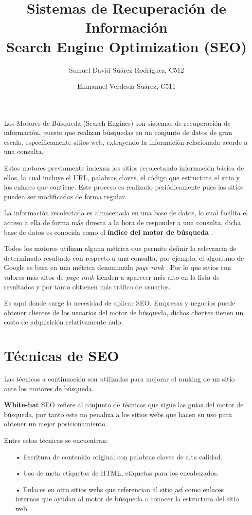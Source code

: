 \documentclass[12pt]{llncs}
\title{Sistemas de Recuperación de Información \\ Search Engine Optimization (SEO)}
\author{
    Samuel David Suárez Rodríguez, C512 \and
    Enmanuel Verdesia Suárez, C511
}
\date{}
\institute{Universidad de La Habana}
\begin{document}
\maketitle

Los Motores de Búsqueda (Search Engines) son sistemas de recuperación de información, puesto que realizan búsquedas en un conjunto de datos de gran escala, específicamente sitios web, extrayendo la información relacionada acorde a una consulta.

Estos motores previamente indexan los sitios recolectando información básica de ellos, la cual incluye el URL, palabras claves, el código que estructura el sitio y los enlaces que contiene. Este proceso es realizado periódicamente pues los sitios pueden ser modificados de forma regular.

La información recolectada es almacenada en una base de datos, lo cual facilita el acceso a ella de forma más directa a la hora de responder a una consulta, dicha base de datos es conocida como el \textbf{índice del motor de búsqueda} \cite{what_is_seo}.

Todos los motores utilizan alguna métrica que permite definir la relevancia de determinado resultado con respecto a una consulta, por ejemplo, el algoritmo de Google se basa en una métrica denominada \textit{page rank} \cite{pr}. Por lo que sitios con valores más altos de \textit{page rank} tienden a aparecer más alto en la lista de resultados y por tanto obtienen más tráfico de usuarios.

Es aquí donde surge la necesidad de aplicar SEO. Empresas y negocios puede obtener clientes de los usuarios del motor de búsqueda, dichos clientes tienen un costo de adquisición relativamente nulo.

\section{Técnicas de SEO}
Las técnicas a continuación son utilizadas para mejorar el ranking de un sitio ante los motores de búsqueda.

\textbf{White-hat} SEO refiere al conjunto de técnicas que sigue las guías del motor de búsqueda, por tanto este no penaliza a los sitios webs que hacen su uso para obtener un mejor posicionamiento.

Entre estas técnicas se encuentran:
\begin{itemize}
    \item[•] Escritura de contenido original con palabras claves de alta calidad.
    \item[•] Uso de meta etiquetas de HTML, etiquetas para los encabezados.
    \item[•] Enlaces en otro sitios webs que referencian al sitio así como enlaces internos que ayudan al motor de búsqueda a conocer la estructura del sitio web.
\end{itemize}
\end{document}
